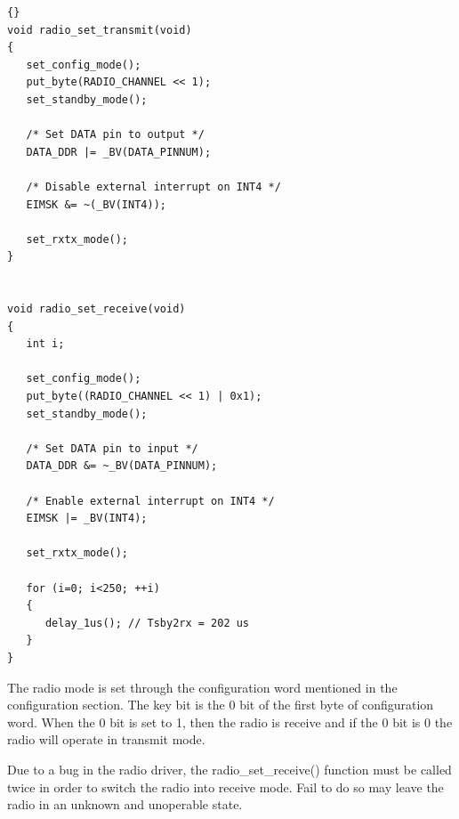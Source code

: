 \lstset{language=c}
\lstset{commentstyle=\textit}
\begin{lstlisting}[frame=trbl]{}
void radio_set_transmit(void)
{
   set_config_mode();
   put_byte(RADIO_CHANNEL << 1);
   set_standby_mode();

   /* Set DATA pin to output */
   DATA_DDR |= _BV(DATA_PINNUM);

   /* Disable external interrupt on INT4 */
   EIMSK &= ~(_BV(INT4));

   set_rxtx_mode();
} 


void radio_set_receive(void)
{
   int i;

   set_config_mode();
   put_byte((RADIO_CHANNEL << 1) | 0x1);
   set_standby_mode();

   /* Set DATA pin to input */
   DATA_DDR &= ~_BV(DATA_PINNUM);

   /* Enable external interrupt on INT4 */
   EIMSK |= _BV(INT4);

   set_rxtx_mode();

   for (i=0; i<250; ++i)
   {
      delay_1us(); // Tsby2rx = 202 us
   }
}
\end{lstlisting}

The radio mode is set through the configuration word mentioned in the configuration section. The key bit is the 0 bit of the first byte of configuration word. When the 0 bit is set to 1, then the radio is receive and if the 0 bit is 0 the radio will operate in transmit mode.

Due to a bug in the radio driver, the radio\_set\_receive() function must be called twice in order to switch the radio into receive mode. Fail to do so may leave the radio in an unknown and unoperable state.

